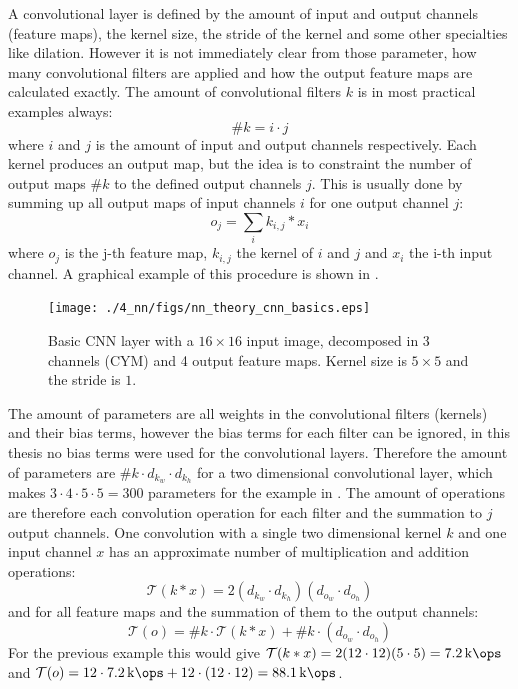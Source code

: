 A convolutional layer is defined by the amount of input and output channels (feature maps), the kernel size, the stride of the kernel and some other specialties like dilation.
However it is not immediately clear from those parameter, how many convolutional filters are applied and how the output feature maps are calculated exactly.
The amount of convolutional filters $k$ is in most practical examples always:
\begin{equation}\label{eq:nn_theory_n_filters}
  \#k = i \cdot j
\end{equation}
where $i$ and $j$ is the amount of input and output channels respectively.
Each kernel produces an output map, but the idea is to constraint the number of output maps $\#k$ to the defined output channels $j$.
This is usually done by summing up all output maps of input channels $i$ for one output channel $j$:
\begin{equation}
  o_j = \sum_{i} k_{i, j} * x_i
\end{equation}
where $o_j$ is the j-th feature map, $k_{i, j}$ the kernel of $i$ and $j$ and $x_i$ the i-th input channel.
A graphical example of this procedure is shown in .
\begin{figure}[!ht]
  \centering
    \texttt{[image: ./4\_nn/figs/nn\_theory\_cnn\_basics.eps]}
  \caption{Basic CNN layer with a $16 \times 16$ input image, decomposed in 3 channels (CYM) and 4 output feature maps. Kernel size is $5 \times 5$ and the stride is $1$.}
  \label{fig:nn_theory_cnn_basics}
\end{figure}
\FloatBarrier
\noindent

The amount of parameters are all weights in the convolutional filters (kernels) and their bias terms, however the bias terms for each filter can be ignored, in this thesis no bias terms were used for the convolutional layers.
Therefore the amount of parameters are $\#k \cdot d_{k_w} \cdot d_{k_h}$ for a two dimensional convolutional layer, which makes $3 \cdot 4 \cdot 5 \cdot 5 = 300$ parameters for the example in .
The amount of operations are therefore each convolution operation for each filter and the summation to $j$ output channels.
One convolution with a single two dimensional kernel $k$ and one input channel $x$ has an approximate number of multiplication and addition operations:
\begin{equation}
  \mathcal{T}(k * x) = 2(d_{k_w} \cdot d_{k_h}) (d_{o_w} \cdot d_{o_h})
\end{equation}
and for all feature maps and the summation of them to the output channels:
\begin{equation}
  \mathcal{T}(o) = \#k \cdot \mathcal{T}(k * x) + \#k \cdot (d_{o_w} \cdot d_{o_h})
\end{equation}
For the previous example this would give $\mathcal{T}(k * x) = 2 (12 \cdot 12) (5 \cdot 5) = \SI{7.2}{\kilo\ops}$ and $\mathcal{T}(o) = 12 \cdot \SI{7.2}{\kilo\ops} + 12 \cdot (12 \cdot 12) = \SI{88.1}{\kilo\ops}$.


